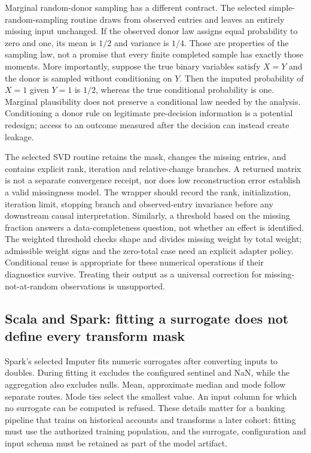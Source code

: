 Marginal random-donor sampling has a different contract. The selected simple-random-sampling routine draws from observed entries and leaves an entirely missing input unchanged. If the observed donor law assigns equal probability to zero and one, its mean is $1/2$ and variance is $1/4$. Those are properties of the sampling law, not a promise that every finite completed sample has exactly those moments. More importantly, suppose the true binary variables satisfy $X=Y$ and the donor is sampled without conditioning on $Y$. Then the imputed probability of $X=1$ given $Y=1$ is $1/2$, whereas the true conditional probability is one. Marginal plausibility does not preserve a conditional law needed by the analysis. Conditioning a donor rule on legitimate pre-decision information is a potential redesign; access to an outcome measured after the decision can instead create leakage.~\citep{exec25_otm_imputejl,exec25_otm_choice}

The selected SVD routine retains the mask, changes the missing entries, and contains explicit rank, iteration and relative-change branches. A returned matrix is not a separate convergence receipt, nor does low reconstruction error establish a valid missingness model. The wrapper should record the rank, initialization, iteration limit, stopping branch and observed-entry invariance before any downstream causal interpretation. Similarly, a threshold based on the missing fraction answers a data-completeness question, not whether an effect is identified. The weighted threshold checks shape and divides missing weight by total weight; admissible weight signs and the zero-total case need an explicit adapter policy. Conditional reuse is appropriate for these numerical operations if their diagnostics survive. Treating their output as a universal correction for missing-not-at-random observations is unsupported.~\citep{exec25_otm_imputejl,exec25_otm_choice}

\subsection{Scala and Spark: fitting a surrogate does not define every transform mask}

Spark's selected Imputer fits numeric surrogates after converting inputs to doubles. During fitting it excludes the configured sentinel and NaN, while the aggregation also excludes nulls. Mean, approximate median and mode follow separate routes. Mode ties select the smallest value. An input column for which no surrogate can be computed is refused. These details matter for a banking pipeline that trains on historical accounts and transforms a later cohort: fitting must use the authorized training population, and the surrogate, configuration and input schema must be retained as part of the model artifact.~\citep{exec25_otm_spark}

